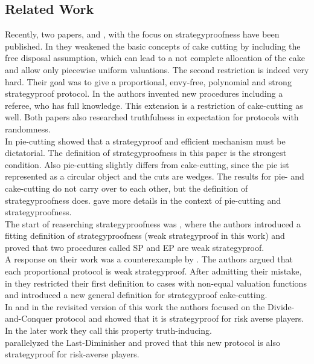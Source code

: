 \pagebreak
\subsection{Related Work}
Recently, two papers, \cite{chen:truth} and \cite{tamuz}, with the focus on strategyproofness have been published. In \cite{chen:truth} they weakened the basic concepts of cake cutting by including the free disposal assumption, which can lead to a not complete allocation of the cake and allow only piecewise uniform valuations. The second restriction is indeed very hard. Their goal was to give a proportional, envy-free, polynomial and strong strategyproof protocol. In \cite{tamuz} the authors invented new procedures including a referee, who has full knowledge. This extension is a restriction of cake-cutting as well. Both papers also researched truthfulness in expectation for protocols with randomness.\\ \newline
In pie-cutting \cite{why} showed that a strategyproof and efficient mechanism must be dictatorial. The definition of strategyproofness in this paper is the strongest condition. Also pie-cutting slightly differs from cake-cutting, since the pie ist represented as a circular object and the cuts are wedges. The results for pie-  and cake-cutting do not carry over to each other, but the definition of strategyproofness does. \cite{pie} gave more details in the context of pie-cutting and strategyproofness. \\
\newline
The start of reaserching strategyproofness was \cite{brams}, where the authors introduced a fitting definition of strategyproofness (weak strategyproof in this work) and proved that two procedures called SP and EP are weak strategyproof.\\ A response on their work was a counterexample by \cite{ccc}. The authors argued that each proportional protocol is weak strategyproof. After admitting their mistake, in \cite{note} they restricted their first definition to cases with non-equal valuation functions and introduced a new general definition for strategyproof cake-cutting.\\
In \cite{dc} and in the revisited version of this work \cite{dc2} the authors focused on the Divide-and-Conquer protocol and showed that it is strategyproof for risk averse players. In the later work they call this property truth-inducing. \\ \cite{lindner:degrees} parallelyzed the Last-Diminisher and proved that this new protocol is also strategyproof for risk-averse players. \pagebreak
